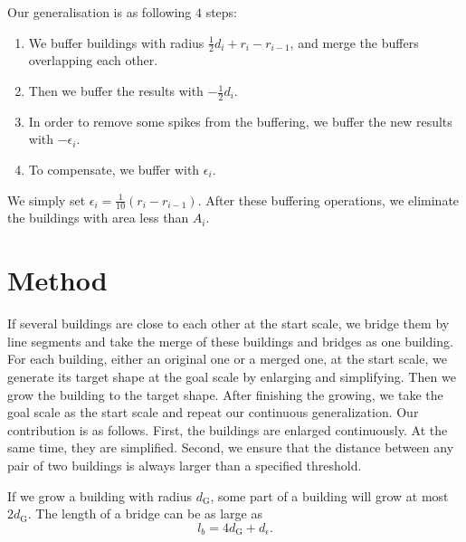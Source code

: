 \documentclass[graybox]{svmult}
\begin{document}
Our generalisation is as following $4$ steps:
\begin{enumerate}[label=(\alph*),leftmargin=2\parindent]
	\item We buffer buildings with 
	radius $\frac{1}{2}d_i+r_i-r_{i-1}$, and merge the buffers 
	overlapping each other.
	\item Then we buffer the results with $-\frac{1}{2}d_i$.
	\item In order to 
	remove some spikes from the buffering, we buffer the new 
	results with $-\epsilon_i$.
	\item To compensate, we buffer with $\epsilon_i$.	
\end{enumerate}
We simply set 
$\epsilon_i=\frac{1}{10}(r_i-r_{i-1})$. After these buffering 
operations, we eliminate the buildings with area less than 
$A_i$.

\section{Method}


If several buildings are close to each other at the start 
scale, we bridge them by line segments and take the merge of these 
buildings 
and bridges as one building.
For each building, either an original one or a merged one, at the start 
scale, 
we generate its target shape at 
the goal scale by enlarging and simplifying. Then we grow the  
building to the target shape. 
%
After finishing the growing, we take the goal scale as the 
start scale and repeat our continuous generalization.
\newline\indent
Our contribution is as follows. First, the buildings 
are enlarged continuously. At the same time, they are simplified. 
Second, we ensure that the distance between any pair of two buildings is 
always larger than a specified threshold.

If we grow a building with radius $d_\mathrm{G}$, some part of a building will 
grow at most $2d_\mathrm{G}$.
The length of a bridge can be as large as
\begin{equation}
\label{eq:BridgeLength}
l_b=4d_\mathrm{G}+d_\epsilon.
\end{equation}
\end{document}
